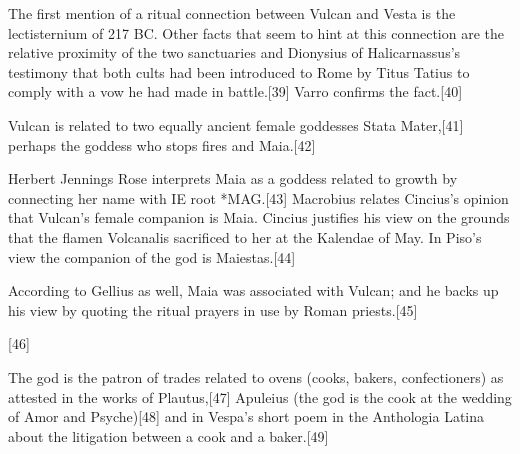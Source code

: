 The first mention of a ritual connection between Vulcan and Vesta is the lectisternium of 217 BC. Other facts that seem to hint at this connection are the relative proximity of the two sanctuaries and Dionysius of Halicarnassus's testimony that both cults had been introduced to Rome by Titus Tatius to comply with a vow he had made in battle.[39] Varro confirms the fact.[40]

Vulcan is related to two equally ancient female goddesses Stata Mater,[41] perhaps the goddess who stops fires and Maia.[42]

Herbert Jennings Rose interprets Maia as a goddess related to growth by connecting her name with IE root *MAG.[43] Macrobius relates Cincius's opinion that Vulcan's female companion is Maia. Cincius justifies his view on the grounds that the flamen Volcanalis sacrificed to her at the Kalendae of May. In Piso's view the companion of the god is Maiestas.[44]

According to Gellius as well, Maia was associated with Vulcan; and he backs up his view by quoting the ritual prayers in use by Roman priests.[45]

[46]

The god is the patron of trades related to ovens (cooks, bakers, confectioners) as attested in the works of Plautus,[47] Apuleius (the god is the cook at the wedding of Amor and Psyche)[48] and in Vespa's short poem in the Anthologia Latina about the litigation between a cook and a baker.[49] 

